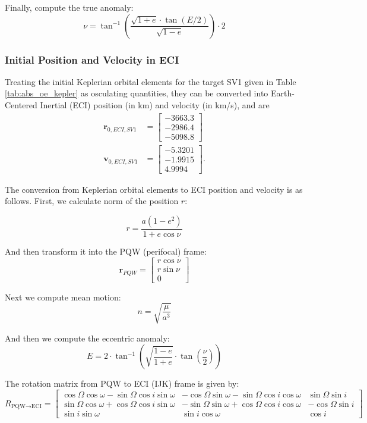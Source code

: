 Finally, compute the true anomaly:
\[
\nu = \tan^{-1} \left( \frac{\sqrt{1 + e} \cdot \tan(E/2)}{\sqrt{1 - e}} \right) \cdot 2
\]

\subsubsection{Initial Position and Velocity in ECI}\label{sec:initial_ECI}
 Treating the initial Keplerian orbital elements for the target SV1 given in Table \ref{tab:abs_oe_kepler} as osculating quantities, they can be converted into Earth-Centered Inertial (ECI) position (in km) and velocity (in km/s), and are 
 \begin{align}
     \boldsymbol{r}_{0, ECI, SV1} &= \begin{bmatrix}
         -3663.3 \\
         -2986.4 \\
         -5098.8
     \end{bmatrix} \\
     \boldsymbol{v}_{0, ECI, SV1} &= \begin{bmatrix}
         -5.3201 \\
         -1.9915 \\
         4.9994
     \end{bmatrix}.
 \end{align}

The conversion from Keplerian orbital elements to ECI position and velocity is as follows. First, we calculate norm of the position $r$:

\[
r = \frac{a(1 - e^2)}{1 + e \cos \nu}
\]

And then transform it into the PQW (perifocal) frame:
\[
\mathbf{r}_{PQW} = \begin{bmatrix}
r \cos \nu \\
r \sin \nu \\
0
\end{bmatrix}
\]

Next we compute mean motion:
\[
n = \sqrt{\frac{\mu}{a^3}}
\]

And then we compute the eccentric anomaly:
\[
E = 2 \cdot \tan^{-1} \left( \sqrt{\frac{1 - e}{1 + e}} \cdot \tan\left(\frac{\nu}{2}\right) \right)
\]

The rotation matrix from PQW to ECI (IJK) frame is given by:
\[
R_{\text{PQW} \to \text{ECI}} = 
\begin{bmatrix}
\cos\Omega\cos\omega - \sin\Omega\cos i\sin\omega & -\cos\Omega\sin\omega - \sin\Omega\cos i\cos\omega & \sin\Omega\sin i \\
\sin\Omega\cos\omega + \cos\Omega\cos i\sin\omega & -\sin\Omega\sin\omega + \cos\Omega\cos i\cos\omega & -\cos\Omega\sin i \\
\sin i\sin\omega & \sin i\cos\omega & \cos i
\end{bmatrix}
\]

